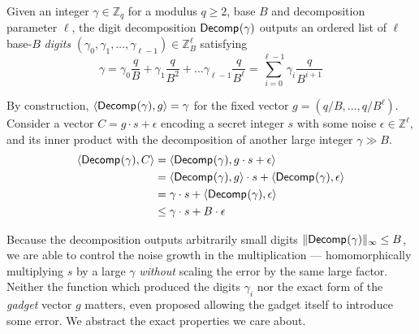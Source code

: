 \begin{definition}
    \label{def:digit-decomposition}
    Given an integer $\gamma\in\mathbb{Z}_q$ for a modulus $q\geq 2$, base $B$ and decomposition parameter $\ell$, the digit decomposition $\mathsf{Decomp}^{}(\gamma)$ outputs an ordered list of $\ell$ base-$B$ \emph{digits} $(\gamma_0, \gamma_1, \dots, \gamma_{\ell-1}) \in \mathbb{Z}_B^\ell$ satisfying
    \begin{equation}
        \label{eq:digit-decomp}
        \gamma = \gamma_0\frac{q}{B} + \gamma_1\frac{q}{B^2} + ... \gamma_{\ell - 1}\frac{q}{B^{\ell}} = \sum_{i=0}^{\ell-1}\gamma_i\frac{q}{B^{i+1}}
    \end{equation}
\end{definition}

By construction, $\langle\mathsf{Decomp}^{}(\gamma), g\rangle = \gamma$ for the fixed vector $g = (q/B, \dots, q/B^{\ell})$. %
Consider a vector $C = g\cdot s + \epsilon$ encoding a secret integer $s$ with some noise $\epsilon\in \mathbb{Z}^{\ell}$, and its inner product with the decomposition of another large integer $\gamma \gg B$.
\begin{align*}
    \langle\mathsf{Decomp}^{}(\gamma), C\rangle &= \langle \mathsf{Decomp}^{}(\gamma), g\cdot s + \epsilon\rangle \\
    &= \langle \mathsf{Decomp}^{}(\gamma), g\rangle \cdot s + \langle\mathsf{Decomp}^{}(\gamma), \epsilon\rangle \\
    &= \gamma \cdot s + \langle\mathsf{Decomp}^{}(\gamma), \epsilon\rangle \\
    &\leq \gamma\cdot s + B\cdot\epsilon
\end{align*}

Because the decomposition outputs arbitrarily small digits $\|\mathsf{Decomp}^{}(\gamma)\|_\infty \leq B$, we are able to control the noise growth in the multiplication --- homomorphically multiplying $s$ by a large $\gamma$ \emph{without} scaling the error by the same large factor. Neither the function which produced the digits $\gamma_i$ nor the exact form of the \emph{gadget} vector $g$ matters, \cite{cryptoeprint:2018/421} even proposed allowing the gadget itself to introduce some error. We abstract the exact properties we care about.

